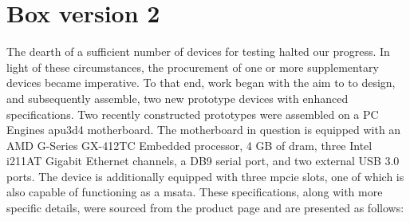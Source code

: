 \section{Box version 2}
\label{sec:box_v2}

The dearth of a sufficient number of devices for testing halted our progress. In light of these circumstances, the procurement of one or more supplementary devices became imperative. To that end, work began with the aim to to design, and subsequently assemble, two new prototype devices with enhanced specifications.
Two recently constructed prototypes were assembled on a PC Engines apu3d4 motherboard. The motherboard in question is equipped with an AMD G-Series GX-412TC Embedded processor, 4 GB of \gls{dram}, three Intel i211AT Gigabit Ethernet channels, a DB9 serial port, and two external USB 3.0 ports. The device is additionally equipped with three \gls{mpcie} slots, one of which is also capable of functioning as a \gls{msata}. 
These specifications, along with more specific details, were sourced from the product page and are presented as follows:

